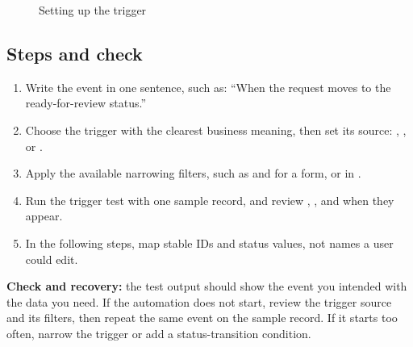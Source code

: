\begin{figure}[H]
\centering
{}
\rclegend
\caption{Setting up the trigger}
\label{fig:builder-sops-triggers-flow}
\end{figure}

\subsection{Steps and check}
\begin{enumerate}
\item Write the event in one sentence, such as: “When the request moves to the ready-for-review status.”
\item Choose the trigger with the clearest business meaning, then set its source: , ,  or .
\item Apply the available narrowing filters, such as  and  for a form, or  in .
\item Run the trigger test with one sample record, and review , ,  and  when they appear.
\item In the following steps, map stable IDs and status values, not names a user could edit.
\end{enumerate}

\textbf{Check and recovery:} the test output should show the event you intended with the data you need. If the automation does not start, review the trigger source and its filters, then repeat the same event on the sample record. If it starts too often, narrow the trigger or add a status-transition condition.

